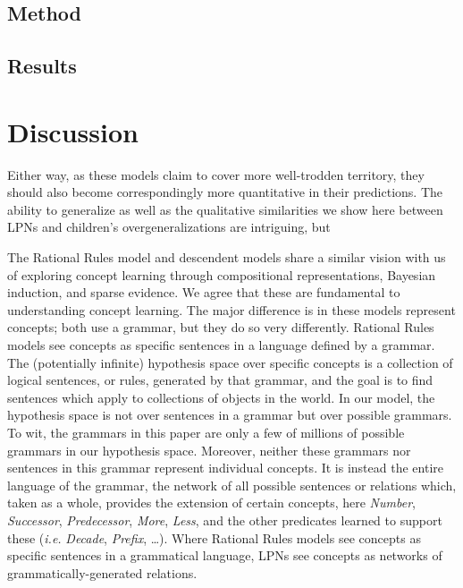 \documentclass[10pt,letterpaper]{article}
\begin{document}

\subsection{Method}


\subsection{Results}


\section{Discussion}


Either way, as these models claim to cover more well-trodden
territory, they should also become correspondingly more quantitative
in their predictions. The ability to generalize as well as the
qualitative similarities we show here between LPNs and children's
overgeneralizations are intriguing, but 


The Rational Rules model and descendent models
\citep{goodman2008rational,T.D.Ullman:2012:1b1b6,PianGoodTen2012}
share a similar vision with us of exploring concept learning through
compositional representations, Bayesian induction, and sparse
evidence. We agree that these are fundamental to understanding concept
learning. The major difference is in these models represent concepts;
both use a grammar, but they do so very differently. Rational Rules
models see concepts as specific sentences in a language defined by a
grammar. The (potentially infinite) hypothesis space over specific
concepts is a collection of logical sentences, or rules, generated by
that grammar, and the goal is to find sentences which apply to
collections of objects in the world. In our model, the hypothesis
space is not over sentences in a grammar but over possible grammars.
To wit, the grammars in this paper are only a few of millions of
possible grammars in our hypothesis space. Moreover, neither these
grammars nor sentences in this grammar represent individual concepts.
It is instead the entire language of the grammar, the network of all
possible sentences or relations which, taken as a whole, provides the
extension of certain concepts, here \emph{Number}, \emph{Successor},
\emph{Predecessor}, \emph{More}, \emph{Less}, and the other predicates
learned to support these ({\it i.e.} \emph{Decade}, \emph{Prefix},
\ldots). Where Rational Rules models see concepts as specific
sentences in a grammatical language, LPNs see concepts as networks of
grammatically-generated relations.
\end{document}
